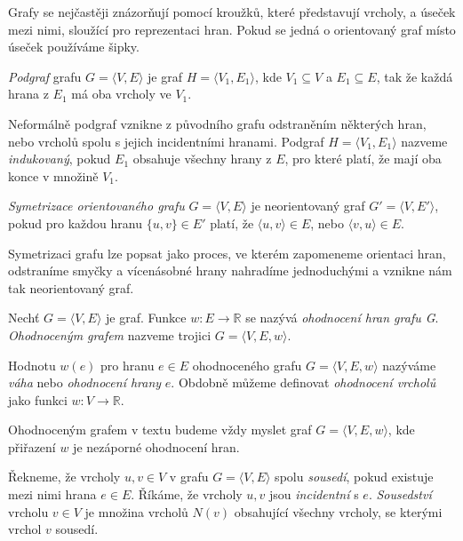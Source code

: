 \documentclass[
  program=infoi,
  biblatex=true,
  sourcecodes=true,
  figures=true,
  glossaries=false,
  index
]{kidiplom}
\begin{document}
Grafy se nejčastěji znázorňují pomocí kroužků, které představují vrcholy, a úseček mezi nimi, sloužící pro reprezentaci hran. Pokud se jedná o orientovaný graf místo úseček používáme šipky.

\begin{definition}[Podgraf]
\textit{Podgraf} grafu $G = \langle V,E\rangle$ je graf $H = \langle V_1,E_1\rangle$, kde $V_1 \subseteq V$ a $E_1 \subseteq E$, tak že každá hrana z $E_1$ má oba vrcholy ve $V_1$. 
\end{definition}

Neformálně podgraf vznikne z původního grafu odstraněním některých hran, nebo vrcholů spolu s jejich incidentními hranami. Podgraf $H = \langle V_1,E_1\rangle$ nazveme \textit{indukovaný}, pokud $E_1$ obsahuje všechny hrany z $E$, pro které platí, že mají oba konce v množině $V_1$.

\begin{definition}
\textit{Symetrizace orientovaného grafu} $G = \langle V,E\rangle$ je neorientovaný graf $G' = \langle V,E'\rangle$, pokud pro každou hranu $\{ u,v \} \in E'$ platí, že $\langle u,v \rangle \in E$, nebo $\langle v,u \rangle \in E$.
\end{definition}

Symetrizaci grafu lze popsat jako proces, ve kterém zapomeneme orientaci hran, odstraníme smyčky a vícenásobné hrany nahradíme jednoduchými a vznikne nám tak neorientovaný graf.

\begin{definition}
Nechť $G = \langle V,E\rangle$ je graf. Funkce $w:E \to \mathbb{R}$ se nazývá \textit{ohodnocení hran grafu G}. \textit{Ohodnoceným grafem} nazveme trojici $G = \langle V,E,w\rangle$.
\end{definition}

Hodnotu $w(e)$ pro hranu $e \in E$ ohodnoceného grafu $G = \langle V,E,w\rangle$ nazýváme \textit{váha} nebo \textit{ohodnocení hrany} $e$. Obdobně můžeme definovat \textit{ohodnocení vrcholů} jako funkci $w:V \to \mathbb{R}$.

\begin{remark}
Ohodnoceným grafem v textu budeme vždy myslet graf $G = \langle V,E,w\rangle$, kde přiřazení $w$ je nezáporné ohodnocení hran.
\end{remark}

\begin{definition}[Sousedství]
Řekneme, že vrcholy $u,v \in V$ v grafu $G = \langle V,E\rangle$ spolu \textit{sousedí}, pokud existuje mezi nimi hrana  $e \in E$. Říkáme, že vrcholy $u,v$ jsou \textit{incidentní} s $e$. \textit{Sousedství} vrcholu $v \in V$ je množina vrcholů $N(v)$ obsahující všechny vrcholy, se kterými vrchol $v$ sousedí.
\end{definition}
\end{document}
